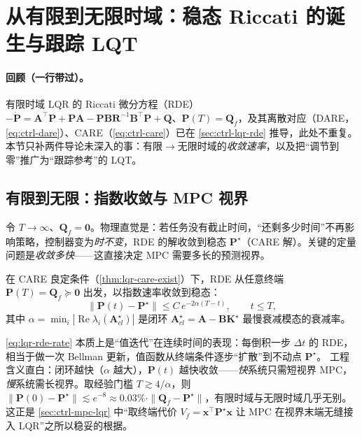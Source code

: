 \section{从有限到无限时域：稳态 Riccati 的诞生与跟踪 LQT}
\label{sec:lqr-finite-track}

\paragraph{回顾（一行带过）。}
有限时域 LQR 的 Riccati 微分方程（RDE）$-\dot{\mathbf P}=\mathbf A^\top\mathbf P+\mathbf P\mathbf A-\mathbf P\mathbf B\mathbf R^{-1}\mathbf B^\top\mathbf P+\mathbf Q$、$\mathbf P(T)=\mathbf Q_f$，及其离散对应（DARE，\cref{eq:ctrl-dare}）、CARE（\cref{eq:ctrl-care}）已在 \cref{sec:ctrl-lqr-rde} 推导，此处不重复。本节只补两件导论未深入的事：有限$\to$无限时域的\emph{收敛速率}，以及把“调节到零”推广为“跟踪参考”的 LQT。

\subsection{有限到无限：指数收敛与 MPC 视界}
\label{sec:lqr-rde-converge}

令 $T\to\infty$、$\mathbf Q_f=\mathbf0$。物理直觉是：若任务没有截止时间，“还剩多少时间”不再影响策略，控制器变为\emph{时不变}，RDE 的解收敛到稳态 $\mathbf P^\star$（CARE 解）。关键的定量问题是\emph{收敛多快}——这直接决定 MPC 需要多长的预测视界。

\begin{theorem}\label{thm:lqr-rde-converge}
在 CARE 良定条件（\cref{thm:lqr-care-exist}）下，RDE 从任意终端 $\mathbf P(T)=\mathbf Q_f\succeq\mathbf0$ 出发，以指数速率收敛到稳态：
\begin{equation}
  \|\mathbf P(t)-\mathbf P^\star\|\le C\,e^{-2\alpha(T-t)},\qquad t\le T,
  \label{eq:lqr-rde-rate}
\end{equation}
其中 $\alpha=\min_i|\operatorname{Re}\lambda_i(\mathbf A_{cl}^\star)|$ 是闭环 $\mathbf A_{cl}^\star=\mathbf A-\mathbf B\mathbf K^\star$ 最慢衰减模态的衰减率。
\end{theorem}

\begin{insight}
\cref{eq:lqr-rde-rate} 本质上是“值迭代”在连续时间的表现：每倒积一步 $\Delta t$ 的 RDE，相当于做一次 Bellman 更新，值函数从终端条件逐步“扩散”到不动点 $\mathbf P^\star$。
工程含义直白：闭环越快（$\alpha$ 越大），$\mathbf P(t)$ 越快收敛——\emph{快}系统只需短视界 MPC，\emph{慢}系统需长视界。取经验门槛 $T\gtrsim 4/\alpha$，则 $\|\mathbf P(0)-\mathbf P^\star\|\lesssim e^{-8}\approx0.03\%\cdot\|\mathbf Q_f-\mathbf P^\star\|$，有限时域与无限时域几乎无别。这正是 \cref{sec:ctrl-mpc-lqr} 中“取终端代价 $V_f=\mathbf x^\top\mathbf P^\star\mathbf x$ 让 MPC 在视界末端无缝接入 LQR”之所以稳妥的根据。
\end{insight}

